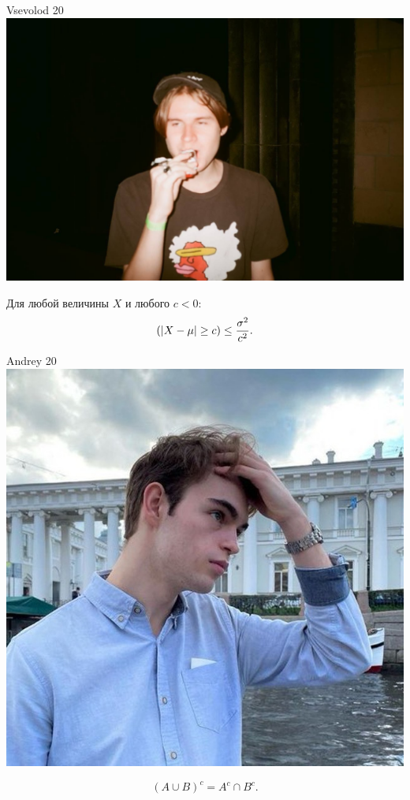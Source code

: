 \documentclass[12pt]{article}
\let\P\relax
\DeclareMathOperator{\P}{\mathbb{P}}
\begin{document}
%
\newpage
\begin{minipage}{0.45\textwidth}
\begin{tinderm}{Vsevolod 20}
\includegraphics[width=\textwidth]{tinder-photo/paramonov.jpg}

  

\begin{mybox}
Для любой величины $X$ и любого $c < 0$: 
\[
\P(|X - \mu| \geq c) \leq \frac{\sigma^2}{c^2}.
\]
\end{mybox}
\end{tinderm}
\end{minipage}
%
%
\begin{minipage}{0.45\textwidth}
\begin{tinderm}{Andrey 20}
\includegraphics[width=\textwidth]{tinder-photo/andrey.jpg}

  

\begin{mybox}
\[
(A \cup B)^c = A^c \cap B^c.
\]
\end{mybox}
\end{tinderm}
\end{minipage}
\end{document}
